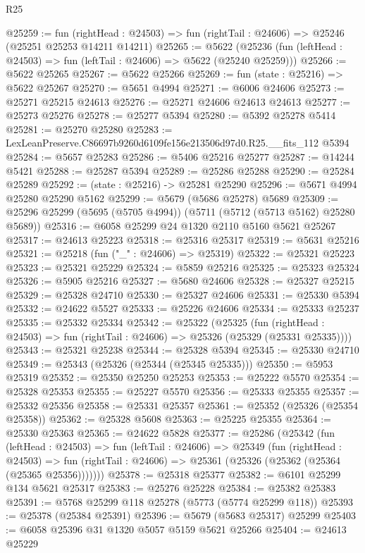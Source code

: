 \begin{lexlean}{R25}
\begin{coremodule}
@25259 := fun (rightHead : @24503) =>
  fun (rightTail : @24606) => @25246 (@25251 @25253 @14211 @14211)
@25265 := @5622
    (@25236 (fun (leftHead : @24503) => fun (leftTail : @24606) => @5622 (@25240 @25259)))
@25266 := @5622 @25265
@25267 := @5622 @25266
@25269 := fun (state : @25216) => @5622 @25267
@25270 := @5651 @4994
@25271 := @6006 @24606
@25273 := @25271 @25215 @24613
@25276 := @25271 @24606 @24613 @24613
@25277 := @25273 @25276
@25278 := @25277 @5394
@25280 := @5392 @25278 @5414
@25281 := @25270 @25280
@25283 := LexLeanPreserve.C86697b9260d6109fe156e213506d97d0.R25.__fits_112 @5394
@25284 := @5657 @25283
@25286 := @5406 @25216 @25277
@25287 := @14244 @5421
@25288 := @25287 @5394
@25289 := @25286 @25288
@25290 := @25284 @25289
@25292 := (state : @25216) -> @25281 @25290
@25296 := @5671 @4994 @25280 @25290 @5162
@25299 := @5679 (@5686 @25278) @5689
@25309 := @25296 @25299 (@5695 (@5705 @4994)) (@5711 (@5712 (@5713 @5162) @25280 @5689))
@25316 := @6058 @25299 @24 @1320 @2110 @5160 @5621 @25267
@25317 := @24613 @25223
@25318 := @25316 @25317
@25319 := @5631 @25216
@25321 := @25218 (fun ("_" : @24606) => @25319)
@25322 := @25321 @25223
@25323 := @25321 @25229
@25324 := @5859 @25216
@25325 := @25323 @25324
@25326 := @5905 @25216
@25327 := @5680 @24606
@25328 := @25327 @25215
@25329 := @25328 @24710
@25330 := @25327 @24606
@25331 := @25330 @5394
@25332 := @24622 @5527
@25333 := @25226 @24606
@25334 := @25333 @25237
@25335 := @25332 @25334
@25342 := @25322
    (@25325
      (fun (rightHead : @24503) => fun (rightTail : @24606) => @25326 (@25329 (@25331 @25335))))
@25343 := @25321 @25238
@25344 := @25328 @5394
@25345 := @25330 @24710
@25349 := @25343 (@25326 (@25344 (@25345 @25335)))
@25350 := @5953 @25319
@25352 := @25350 @25250 @25253
@25353 := @25222 @5570
@25354 := @25328 @25353
@25355 := @25227 @5570
@25356 := @25333 @25355
@25357 := @25332 @25356
@25358 := @25331 @25357
@25361 := @25352 (@25326 (@25354 @25358))
@25362 := @25328 @5608
@25363 := @25225 @25355
@25364 := @25330 @25363
@25365 := @24622 @5828
@25377 := @25286
    (@25342
      (fun (leftHead : @24503) =>
      fun (leftTail : @24606) =>
      @25349
        (fun (rightHead : @24503) =>
        fun (rightTail : @24606) => @25361 (@25326 (@25362 (@25364 (@25365 @25356)))))))
@25378 := @25318 @25377
@25382 := @6101 @25299 @134 @5621 @25317
@25383 := @25276 @25228
@25384 := @25382 @25383
@25391 := @5768 @25299 @118 @25278 (@5773 (@5774 @25299 @118))
@25393 := @25378 (@25384 @25391)
@25396 := @5679 (@5683 @25317) @25299
@25403 := @6058 @25396 @31 @1320 @5057 @5159 @5621 @25266
@25404 := @24613 @25229

\end{coremodule}
\end{lexlean}
